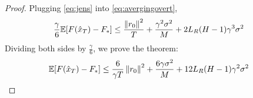 \begin{proof}
    Plugging \eqref{eq:jens} into \eqref{eq:avergingovert},
    \begin{align}
        \begin{split}
            \frac{\gamma}{6} \mathbb{E} [F(\hat{x}_T) - F_*]
            &\leq \frac{\left\|r_0\right\|^2}{T}
            + \frac{\gamma^2 \sigma^2}{M}
            + 2 L_R (H-1) \gamma^3 \sigma^2
        \end{split}
    \end{align}
    Dividing both sides by $\frac{\gamma}{6}$, we prove the theorem:
    \begin{align}
        \begin{split}
            \mathbb{E} [F(\hat{x}_T) - F_*]
            &\leq \frac{6}{ \gamma T} \left\|r_0\right\|^2
            + \frac{6 \gamma \sigma^2}{M}
            + 12 L_R (H-1) \gamma^2 \sigma^2
        \end{split}
    \end{align}
\end{proof}